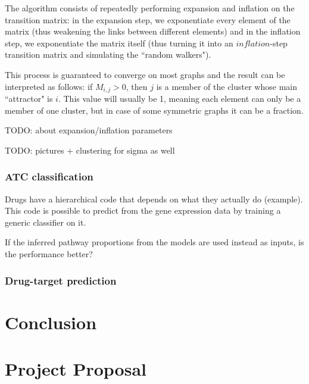 \documentclass[12pt,a4paper,twoside,openright]{report}
\begin{document}


The algorithm consists of repeatedly performing expansion and inflation on the transition matrix: in the expansion step, we exponentiate every element of the matrix (thus weakening the links between different elements) and in the inflation step, we exponentiate the matrix itself (thus turning it into an $\mathit{inflation}$-step transition matrix and simulating the ``random walkers").

This process is guaranteed to converge on most graphs and the result can be interpreted as follows: if $M_{i,j} > 0$, then $j$ is a member of the cluster whose main ``attractor" is $i$. This value will usually be 1, meaning each element can only be a member of one cluster, but in case of some symmetric graphs it can be a fraction.

TODO: about expansion/inflation parameters

TODO: pictures + clustering for sigma as well

\subsection{ATC classification}

Drugs have a hierarchical code that depends on what they actually do (example). This code is possible to predict from the gene expression data by training a generic classifier on it.

If the inferred pathway proportions from the models are used instead as inputs, is the performance better?

\subsection{Drug-target prediction}

\chapter{Conclusion}



\appendix

\chapter{Project Proposal}


\end{document}
